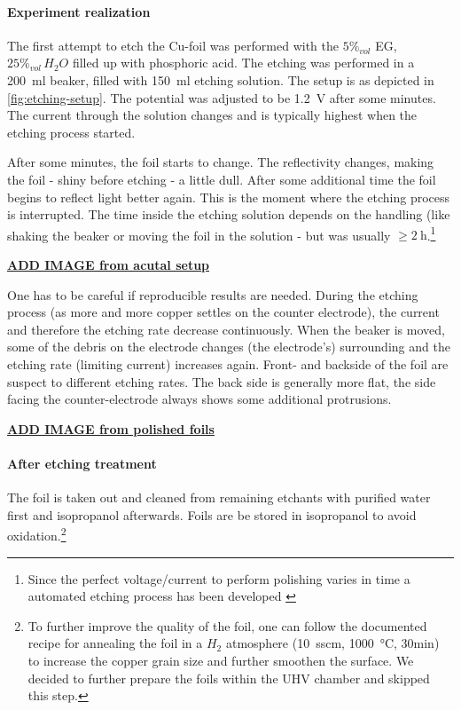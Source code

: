 
\paragraph{Experiment realization}The first attempt to etch the Cu-foil was performed with the $5\%_{vol}$ EG, $25\%_{vol}\,H_2O$ filled up with phosphoric acid. The etching was performed in a \SI{200}{\ml} beaker, filled with \SI{150}{\ml} etching solution. The setup is as depicted in \autoref{fig:etching-setup}. The potential was adjusted to be \SI{1.2}{\V} after some minutes. The current through the solution changes and is typically highest when the etching process started. 

After some minutes, the foil starts to change. The reflectivity changes, making the foil - shiny before etching - a little dull. After some additional time the foil begins to reflect light better again. This is the moment where the etching process is interrupted. The time inside the etching solution depends on the handling (like shaking the beaker or moving the foil in the solution - but was usually $\geq \SI{2}{\hour}$.\footnote{Since the perfect voltage/current to perform polishing varies in time a automated etching process has been developed \cite{palmieri_besides_2001}}

\underline{\textbf{ADD IMAGE from acutal setup}}

One has to be careful if reproducible results are needed. During the etching process (as more and more copper settles on the counter electrode), the current and therefore the etching rate decrease continuously. When the beaker is moved, some of the debris on the electrode changes (the electrode's) surrounding and the etching rate (limiting current) increases again. Front- and backside of the foil are suspect to different etching rates. The back side is generally more flat, the side facing the counter-electrode always shows some additional protrusions.

\underline{\textbf{ADD IMAGE from polished foils}}
		
\paragraph{After etching treatment}
The foil is taken out and cleaned from remaining etchants with purified water first and isopropanol afterwards. Foils are be stored in isopropanol to avoid oxidation.\footnote{To further improve the quality of the foil, one can follow the documented recipe for annealing the foil in a $H_2$ atmosphere (\SI{10}{sscm}, \SI{1000}{\celsius}, 30min)\cite{kim_synthesis_2012} to increase the copper grain size and further smoothen the surface. We decided to further prepare the foils within the UHV chamber and skipped this step.}

